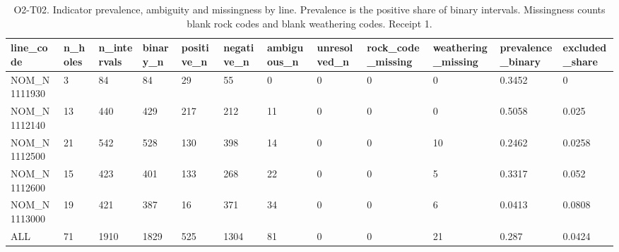 \begin{table}[ht]
\centering
\footnotesize
\caption{O2-T02. Indicator prevalence, ambiguity and missingness by line. Prevalence is the positive share of binary intervals. Missingness counts blank rock codes and blank weathering codes. Receipt 1.}
\label{tab:O2-T02}
\begin{tabular}{llllllllllll}
\toprule
line\_code & n\_holes & n\_intervals & binary\_n & positive\_n & negative\_n & ambiguous\_n & unresolved\_n & rock\_code\_missing & weathering\_missing & prevalence\_binary & excluded\_share \\
\midrule
NOM\_N1111930 & 3 & 84 & 84 & 29 & 55 & 0 & 0 & 0 & 0 & 0.3452 & 0 \\
NOM\_N1112140 & 13 & 440 & 429 & 217 & 212 & 11 & 0 & 0 & 0 & 0.5058 & 0.025 \\
NOM\_N1112500 & 21 & 542 & 528 & 130 & 398 & 14 & 0 & 0 & 10 & 0.2462 & 0.0258 \\
NOM\_N1112600 & 15 & 423 & 401 & 133 & 268 & 22 & 0 & 0 & 5 & 0.3317 & 0.052 \\
NOM\_N1113000 & 19 & 421 & 387 & 16 & 371 & 34 & 0 & 0 & 6 & 0.0413 & 0.0808 \\
ALL & 71 & 1910 & 1829 & 525 & 1304 & 81 & 0 & 0 & 21 & 0.287 & 0.0424 \\
\bottomrule
\end{tabular}
\end{table}
